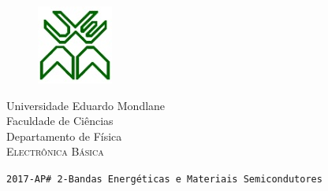 \documentclass[12pt,a4paper,titlepage]{report}
\author{Bartolomeu J. Ubisse}
\begin{document}
\begin{figure}[htb]

\centering
\includegraphics[scale=1]{UEM-logotipo}
\end{figure}
\centering
{ \Large Universidade Eduardo Mondlane}\\[0.3cm] 
\large Faculdade de Ci\^encias\\[0.2cm]
 \large Departamento de F\'isica\\[0.5cm]

\textsc{Electr\^onica B\'asica} \\[1cm]
\begin{flushleft}
\tt 2017-AP\# 2-Bandas Energ\'eticas e Materiais Semicondutores\\
\hrulefill
\end{flushleft}
\end{document}
